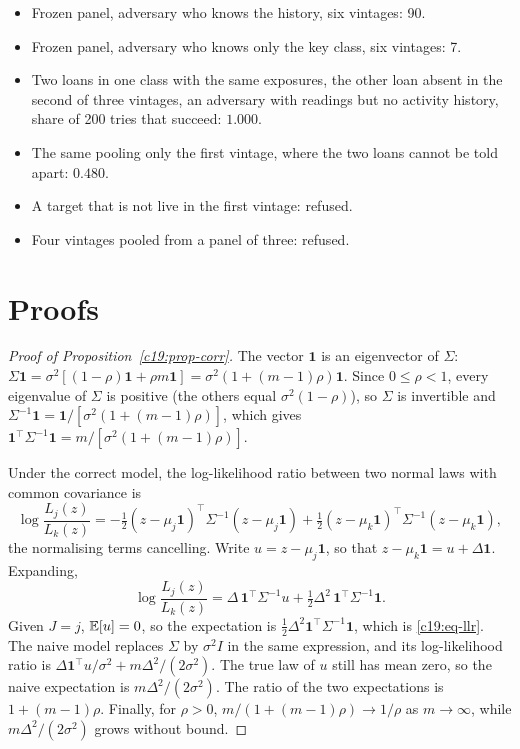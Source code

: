 \begin{mdframed}[linecolor=gray!60,backgroundcolor=gray!5]
\begin{itemize}
\item Frozen panel, adversary who knows the history, six vintages: 90.
\item Frozen panel, adversary who knows only the key class, six vintages: 7.
\item Two loans in one class with the same exposures, the other loan absent in the second of three
vintages, an adversary with readings but no activity history, share of 200 tries that succeed: $1.000$.
\item The same pooling only the first vintage, where the two loans cannot be told apart: $0.480$.
\item A target that is not live in the first vintage: refused.
\item Four vintages pooled from a panel of three: refused.
\end{itemize}
\end{mdframed}

\section{Proofs}

\begin{proof}[Proof of Proposition~\ref{c19:prop-corr}]
The vector $\mathbf 1$ is an eigenvector of $\Sigma$: $\Sigma\mathbf 1=\sigma^2[(1-\rho)\mathbf 1+\rho m\mathbf 1]=\sigma^2(1+(m-1)\rho)\mathbf 1$. Since $0\le\rho<1$, every eigenvalue of $\Sigma$ is positive (the others equal
$\sigma^2(1-\rho)$), so $\Sigma$ is invertible and $\Sigma^{-1}\mathbf 1=\mathbf 1/[\sigma^2(1+(m-1)\rho)]$, which gives $\mathbf 1^\top\Sigma^{-1}\mathbf 1=m/[\sigma^2(1+(m-1)\rho)]$.

Under the correct model, the log-likelihood ratio between two normal laws with common covariance is
\[\log\frac{L_j(z)}{L_k(z)}=-\tfrac12(z-\mu_j\mathbf 1)^\top\Sigma^{-1}(z-\mu_j\mathbf 1)+\tfrac12(z-\mu_k\mathbf 1)^\top\Sigma^{-1}(z-\mu_k\mathbf 1),\]
the normalising terms cancelling. Write $u=z-\mu_j\mathbf 1$, so that $z-\mu_k\mathbf 1=u+\Delta\mathbf 1$. Expanding,
\[\log\frac{L_j(z)}{L_k(z)}=\Delta\,\mathbf 1^\top\Sigma^{-1}u+\tfrac12\Delta^2\,\mathbf 1^\top\Sigma^{-1}\mathbf 1.\]
Given $J=j$, $\mathbb{E}[u]=0$, so the expectation is $\tfrac12\Delta^2\mathbf 1^\top\Sigma^{-1}\mathbf 1$, which is \eqref{c19:eq-llr}. The naive model replaces $\Sigma$ by $\sigma^2I$ in the same expression, and its log-likelihood ratio is $\Delta\mathbf 1^\top u/\sigma^2+m\Delta^2/(2\sigma^2)$.
The true law of $u$ still has mean zero, so the naive expectation is $m\Delta^2/(2\sigma^2)$. The ratio of the
two expectations is $1+(m-1)\rho$. Finally, for $\rho>0$, $m/(1+(m-1)\rho)\to1/\rho$ as $m\to\infty$,
while $m\Delta^2/(2\sigma^2)$ grows without bound.
\end{proof}

